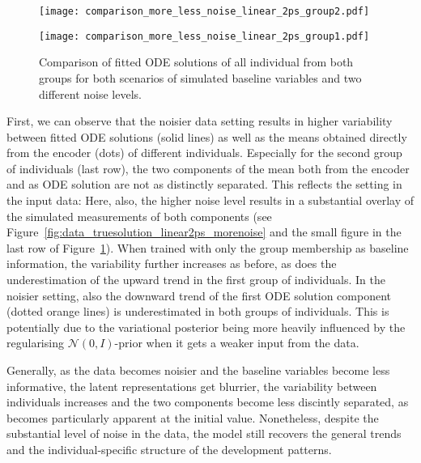 \begin{figure}
	\centering
	\begin{minipage}{\linewidth}
	\texttt{[image: comparison\_more\_less\_noise\_linear\_2ps\_group2.pdf]}
	\end{minipage}
	\begin{minipage}{\linewidth}
		\texttt{[image: comparison\_more\_less\_noise\_linear\_2ps\_group1.pdf]}
	\end{minipage}
	\caption{Comparison of fitted ODE solutions of all individual from both groups for both scenarios of simulated baseline variables and two different noise levels.}
	\label{fig:apps_allinds_comparison_morelessnoise_bothgroups_linear}
\end{figure}

First, we can observe that the noisier data setting results in higher variability between fitted ODE solutions (solid lines) as well as the means obtained directly from the encoder (dots) of different individuals. Especially for the second group of individuals (last row), the two components of the mean both from the encoder and as ODE solution are not as distinctly separated. This reflects the setting in the input data: Here, also, the higher noise level results in a substantial overlay of the simulated measurements of both components (see Figure~\ref{fig:data_truesolution_linear2ps_morenoise} and the small figure in the last row of Figure~\ref{fig:apps_allinds_comparison_morelessnoise_bothgroups_linear}). When trained with only the group membership as baseline information, the variability further increases as before, as does the underestimation of the upward trend in the first group of individuals. In the noisier setting, also the downward trend of the first ODE solution component (dotted orange lines) is underestimated in both groups of individuals. 
This is potentially due to the variational posterior being more heavily influenced by the regularising $\mathcal{N}(0,I)$-prior when it gets a weaker input from the data. 

Generally, as the data becomes noisier and the baseline variables become less informative, the latent representations get blurrier, the variability between individuals increases and the two components become less discintly separated, as becomes particularly apparent at the initial value. Nonetheless, despite the substantial level of noise in the data, the model still recovers the general trends and the individual-specific structure of the development patterns. 

